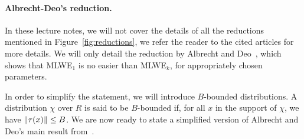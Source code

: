 \paragraph{Albrecht-Deo's reduction.} In these lecture notes, we will not cover the details of all the reductions mentioned in Figure~\ref{fig:reductions}, we refer the reader to the cited articles for more details. We will only detail the reduction by Albrecht and Deo~\cite{AD17}, which shows that MLWE$_{1}$ is no easier than MLWE$_{k}$, for appropriately chosen parameters.



In order to simplify the statement, we will introduce $B$-bounded distributions. A distribution $\chi$ over $R$ is said to be $B$-bounded if, for all $x$ in the support of $\chi$, we have $\|\tau(x)\| \leq B$. We are now ready to state a simplified version of Albrecht and Deo's main result from~\cite{AD17}.

